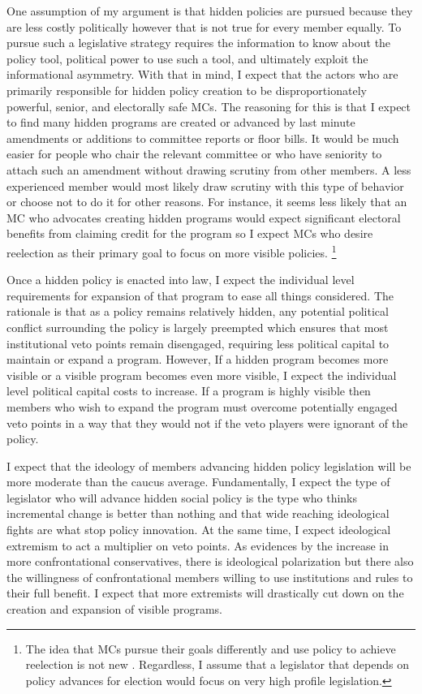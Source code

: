\documentclass[12pt]{article}
\begin{document}
One assumption of my argument is that hidden policies are pursued because they are less costly politically however that is not true for every member equally. To pursue such a legislative strategy requires the information to know about the policy tool, political power to use such a tool, and ultimately exploit the informational asymmetry. With that in mind, I expect that the actors who are primarily responsible for hidden policy creation to be disproportionately powerful, senior, and electorally safe MCs. The reasoning for this is that I expect to find many hidden programs are created or advanced by last minute amendments or additions to committee reports or floor bills. It would be much easier for people who chair the relevant committee or who have seniority to attach such an amendment without drawing scrutiny from other members. A less experienced member would most likely draw scrutiny with this type of behavior or choose not to do it for other reasons. For instance, it seems less likely that an MC who advocates creating hidden programs would expect significant electoral benefits from claiming credit for the program so I expect MCs who desire reelection as their primary goal to focus on more visible policies. \footnote{
The idea that MCs pursue their goals differently and use policy to achieve reelection is not new \citep{fenno1973, kernell1999}. Regardless, I assume that a legislator that depends on policy advances for election would focus on very high profile legislation.} 


Once a hidden policy is enacted into law, I expect the individual level requirements for expansion of that program to ease all things considered. The rationale is that as a policy remains relatively hidden, any potential political conflict surrounding the policy is largely preempted which ensures that most institutional veto points remain disengaged, requiring less political capital to maintain or expand a program. However, If a hidden program becomes more visible or a visible program becomes even more visible, I expect the individual level political capital costs to increase. If a program is highly visible then members who wish to expand the program must overcome potentially engaged veto points in a way that they would not if the veto players were ignorant of the policy. 

I expect that the ideology of members advancing hidden policy legislation will be more moderate than the caucus average. Fundamentally, I expect the type of legislator who will advance hidden social policy is the type who thinks incremental change is better than nothing and that wide reaching ideological fights are what stop policy innovation. At the same time, I expect ideological extremism to act a multiplier on veto points. As evidences by the increase in more confrontational conservatives, there is ideological polarization but there also the willingness of confrontational members willing to use institutions and rules to their full benefit. I expect that more extremists will drastically cut down on the creation and expansion of visible programs.
\end{document}
